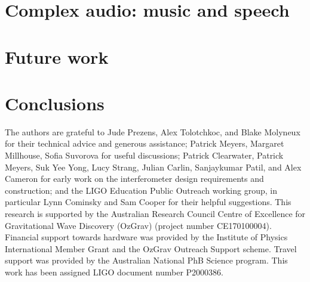 \documentclass[pra,superscriptaddress,reprint,amsmath,amssymb,nofootinbib]{revtex4-1}
\begin{document}
\section{Complex audio: music and speech}
\label{sec:optical_microphone}



\section{Future work}
\label{sec:future_work}



\section{Conclusions}
\label{sec:conclusions}






\begin{acknowledgments}
The authors are grateful to Jude Prezens, Alex Tolotchkoc, and Blake Molyneux for their technical advice and generous assistance; Patrick Meyers, Margaret Millhouse, Sofia Suvorova for useful discussions; Patrick Clearwater, Patrick Meyers, Suk Yee Yong, Lucy Strang, Julian Carlin, Sanjaykumar Patil, and Alex Cameron for early work on the interferometer design requirements and construction; and the LIGO Education Public Outreach working group, in particular Lynn Cominsky and Sam Cooper for their helpful suggestions.  
This research is supported by the Australian Research Council Centre of Excellence for Gravitational Wave Discovery (OzGrav) (project number CE170100004). 
Financial support towards hardware was provided by the Institute of Physics International Member Grant and the OzGrav Outreach Support scheme. 
Travel support was provided by the Australian National PhB Science program.
This work has been assigned LIGO document number P2000386. 

\end{acknowledgments}


\appendix



\nocite{*}


\end{document}
